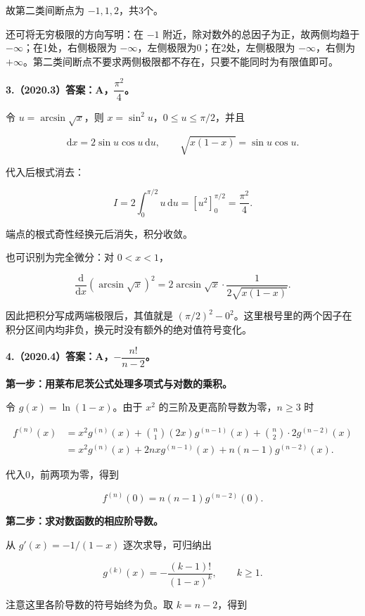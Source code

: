 \documentclass[UTF8,11pt,fontset=windows]{ctexart}
\begin{document}
故第二类间断点为 $-1,1,2$，共3个。

还可将无穷极限的方向写明：在 $-1$ 附近，除对数外的总因子为正，故两侧均趋于 $-\infty$；在1处，右侧极限为 $-\infty$，左侧极限为0；在2处，左侧极限为 $-\infty$，右侧为 $+\infty$。第二类间断点不要求两侧极限都不存在，只要不能同时为有限值即可。

\clearpage

\textbf{3.（2020.3）答案：A，$\dfrac{\pi^2}{4}$。}

令 $u=\arcsin\sqrt x$，则 $x=\sin^2u$，$0\le u\le\pi/2$，并且

$$
\mathrm dx=2\sin u\cos u\,\mathrm du,
\qquad \sqrt{x(1-x)}=\sin u\cos u.
$$

代入后根式消去：

$$
I=2\int_0^{\pi/2}u\,\mathrm du
=\left[u^2\right]_0^{\pi/2}=\frac{\pi^2}{4}.
$$

端点的根式奇性经换元后消失，积分收敛。

也可识别为完全微分：对 $0<x<1$，

$$
\frac{\mathrm d}{\mathrm dx}(\arcsin\sqrt x)^2
=2\arcsin\sqrt x\cdot\frac1{2\sqrt{x(1-x)}}.
$$

因此把积分写成两端极限后，其值就是 $(\pi/2)^2-0^2$。这里根号里的两个因子在积分区间内均非负，换元时没有额外的绝对值符号变化。

\clearpage

\textbf{4.（2020.4）答案：A，$-\dfrac{n!}{n-2}$。}

\textbf{第一步：用莱布尼茨公式处理多项式与对数的乘积。}

令 $g(x)=\ln(1-x)$。由于 $x^2$ 的三阶及更高阶导数为零，$n\ge3$ 时

$$
\begin{aligned}
f^{(n)}(x)
&=x^2g^{(n)}(x)+\binom n1(2x)g^{(n-1)}(x)
 +\binom n2\cdot2g^{(n-2)}(x)\\
&=x^2g^{(n)}(x)+2nxg^{(n-1)}(x)+n(n-1)g^{(n-2)}(x).
\end{aligned}
$$

代入0，前两项为零，得到

$$
f^{(n)}(0)=n(n-1)g^{(n-2)}(0).
$$

\textbf{第二步：求对数函数的相应阶导数。}

从 $g'(x)=-1/(1-x)$ 逐次求导，可归纳出

$$
g^{(k)}(x)=-\frac{(k-1)!}{(1-x)^k},\qquad k\ge1.
$$

注意这里各阶导数的符号始终为负。取 $k=n-2$，得到
\end{document}
